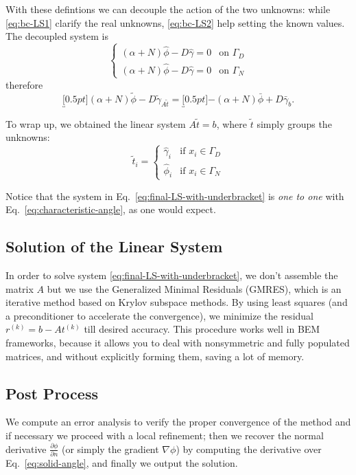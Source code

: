 With these defintions we can decouple the action of the two unknowns: while \eqref{eq:bc-LS1} clarify the real unknowns, \eqref{eq:bc-LS2} help setting the known values. The decoupled system is 
\begin{equation*}
\begin{cases}
(\alpha+N)\hat{\phi}-D\hat{\gamma}=0 & \text{on }\Gamma_D \\
(\alpha+N)\hat{\phi}-D\hat{\gamma}=0 & \text{on }\Gamma_N
\end{cases}
\end{equation*}
therefore
\begin{equation}
\label{eq:final-LS-with-underbracket}
\underbracket[0.5pt]{(\alpha+N)\tilde{\phi}-D\tilde{\gamma}}_{A\tilde{t}}=\underbracket[0.5pt]{-(\alpha+N)\bar{\phi}+D\bar{\gamma}}_{b}.
\end{equation}

To wrap up, we obtained the linear system $A\tilde{t}=b$, where $\tilde{t}$ simply groups the unknowns:
\begin{equation*}
\tilde{t}_i=
\begin{cases}
\hat{\gamma}_i &\text{if }x_i\in\Gamma_D \\
\hat{\phi}_i &\text{if }x_i\in\Gamma_N  
\end{cases}
\end{equation*}

Notice that the system in Eq.~\eqref{eq:final-LS-with-underbracket} is \emph{one to one} with Eq.~\eqref{eq:characteristic-angle}, as one would expect.

\subsection{Solution of the Linear System}
\label{sub:solution_of_the_linear_system}

In order to solve system \eqref{eq:final-LS-with-underbracket}, we don't assemble the matrix $A$ but we use the Generalized Minimal Residuals (GMRES), which is an iterative method based on Krylov subspace methods. By using least squares (and a preconditioner to accelerate the convergence), we minimize the residual $r^{(k)}=b-At^{(k)}$ till desired accuracy. This procedure works well in BEM frameworks, because it allows you to deal with nonsymmetric and fully populated matrices, and without explicitly forming them, saving a lot of memory.

\subsection{Post Process}
\label{sub:post_process}

We compute an error analysis to verify the proper convergence of the method and if necessary we proceed with a local refinement; then we recover the normal derivative $\frac{\partial \phi}{\partial n}$ (or simply the gradient $\nabla\phi$) by computing the derivative over Eq.~\eqref{eq:solid-angle}, and finally we output the solution.




